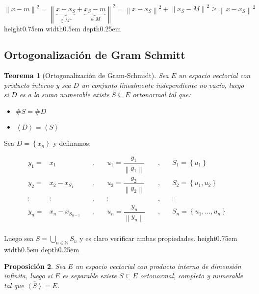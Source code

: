 \documentclass[11pt]{article}
\newcommand{\N}{{\mathbb{N}}}
\newcommand{\norm}[1]{\left\lVert#1\right\rVert}
\newcommand{\ip}[1]{\left\langle#1\right\rangle}
\newcommand{\sett}[1]{\left\lbrace#1\right\rbrace}
\newcommand{\Bigcup}[2]{\bigcup\limits_{#1}{#2}}
\newtheorem{theorem}{Teorema}
\numberwithin{theorem}{subsection}
\newtheorem{proposition}[theorem]{Proposici\'on}
\newenvironment{proof}[1][Demostraci\'on]{\begin{trivlist}
		\item[\hskip \labelsep {\bfseries #1}]}{\end{trivlist}}
\newcommand{\qed}{\nobreak \ifvmode \relax \else
	\ifdim\lastskip<1.5em \hskip-\lastskip
	\hskip1.5em plus0em minus0.5em \fi \nobreak
	\vrule height0.75em width0.5em depth0.25em\fi}
\begin{document}
\begin{proof}
	$\norm{x - m}^2 = \norm{\underbrace{x- x_S}_{\in M^{\perp}} + \underbrace{x_S - m}_{\in M}}^2 = \norm{x-x_S}^2 + \norm{x_S - M}^2 \geq \norm{x-x_S}^2$ \qed
\end{proof}

\subsection{Ortogonalizaci\'on de Gram Schmitt}

\begin{theorem}[Ortogonalizaci\'on de Gram-Schmidt]
	\label{Ortogonalizacion de GS}
	Sea $E$ un espacio vectorial con producto interno y sea $D$ un conjunto linealmente independiente no vac\'io, luego si $D$ es a lo sumo numerable existe $S	 \subseteq E$ ortonormal tal que:
	
	\begin{itemize}
		\item $\# S = \# D$
		\item $\ip{D} = \ip{S}$
	\end{itemize}
\end{theorem}

\begin{proof}
	Sea $D = \sett{x_n}$ y definamos:
	
	\[
		\begin{array}{cccccc}
			y_1 = & x_1 & \quad,\quad & u_1 = \dfrac{y_1}{\norm{y_1}} & \quad,\quad & S_1 = \sett{u_1} \\ 
			y_2 = & x_2 - x_{S_1} & \quad,\quad & u_2 = \dfrac{y_2}{\norm{y_2}} & \quad,\quad & S_2 = \sett{u_1,u_2} \\ 
			\vdots & \vdots & \quad,\quad & \vdots & \quad,\quad & \vdots \\ 
			y_n = & x_n - x_{S_{n-1}}  & \quad,\quad & u_n = \dfrac{y_n}{\norm{y_n}} & \quad,\quad & S_n = \sett{u_1, \dots, u_n} \\ 
		\end{array}
	\]
	
	Luego sea $S = \Bigcup{n \in \N}{S_n}$ y es claro verificar ambas propiedades. \qed
	
\end{proof}

\begin{proposition}
	\label{Aproximacion por ortonormal separable en Hilbert separable}
	Sea $E$ un espacio vectorial con producto interno de dimensi\'on infinita, luego si $E$ es separable existe $S \subseteq E$ ortonormal, completo y numerable tal que $\overline{\ip{S}} = E$.
\end{proposition}
\end{document}
